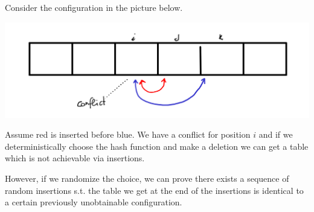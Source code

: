 \documentclass[a4paper, 12pt]{article}
\begin{document}
Consider the configuration in the picture below.

\includegraphics*[scale=0.24]{./images/cuckoo-hashing.png}

Assume red is inserted before blue. We have a conflict for position \(i\) and if we deterministically
choose the hash function and make a deletion we can get a table which is not achievable via insertions.

However, if we randomize the choice, we can prove there exists a sequence of random insertions s.t. the table
we get at the end of the insertions is identical to a certain previously unobtainable configuration.
\end{document}
